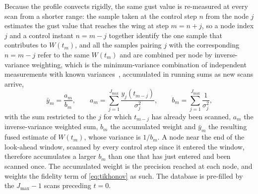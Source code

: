 Because the profile convects rigidly, the same gust value is re-measured at every scan from a shorter range: the sample taken at the control step $n$ from the node $j$ estimates the gust value that reaches the wing at step $m = n+j$, so a node index $j$ and a control instant $n=m-j$ together identify the one sample that contributes to $W(t_m)$, and all the samples pairing $j$ with the corresponding $n=m-j$ refer to the same $W(t_m)$ and are combined per node by inverse-variance weighting, which is the minimum-variance combination of independent measurements with known variances~\cite{kay1993estimation}, accumulated in running sums as new scans arrive,
\begin{equation}
\bar{y}_m = \frac{a_m}{b_m}, \qquad
a_m = \sum_{j=1}^{J_{\max}} \frac{y_j(t_{m-j})}{\sigma_j^2}, \qquad
b_m = \sum_{j=1}^{J_{\max}} \frac{1}{\sigma_j^2},
\label{eq:invvar}
\end{equation}
with the sum restricted to the $j$ for which $t_{m-j}$ has already been scanned, $a_m$ the inverse-variance weighted sum, $b_m$ the accumulated weight and $\bar{y}_m$ the resulting fused estimate of $W(t_m)$, whose variance is $1/b_m$. A node near the end of the look-ahead window, scanned by every control step since it entered the window, therefore accumulates a larger $b_m$ than one that has just entered and been scanned once. The accumulated weight is the precision reached at each node, and weights the fidelity term of \cref{eq:tikhonov} as such. The database is pre-filled by the $J_{\max}-1$ scans preceding $t=0$.

